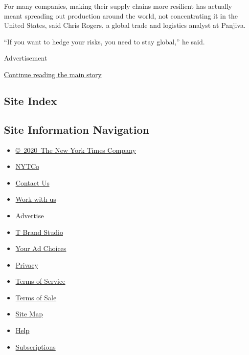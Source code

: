 For many companies, making their supply chains more resilient has
actually meant spreading out production around the world, not
concentrating it in the United States, said Chris Rogers, a global trade
and logistics analyst at Panjiva.

``If you want to hedge your risks, you need to stay global,'' he said.

Advertisement

\protect\hyperlink{after-bottom}{Continue reading the main story}

\hypertarget{site-index}{%
\subsection{Site Index}\label{site-index}}

\hypertarget{site-information-navigation}{%
\subsection{Site Information
Navigation}\label{site-information-navigation}}

\begin{itemize}
\tightlist
\item
  \href{https://help.nytimes.com/hc/en-us/articles/115014792127-Copyright-notice}{©~2020~The
  New York Times Company}
\end{itemize}

\begin{itemize}
\tightlist
\item
  \href{https://www.nytco.com/}{NYTCo}
\item
  \href{https://help.nytimes.com/hc/en-us/articles/115015385887-Contact-Us}{Contact
  Us}
\item
  \href{https://www.nytco.com/careers/}{Work with us}
\item
  \href{https://nytmediakit.com/}{Advertise}
\item
  \href{http://www.tbrandstudio.com/}{T Brand Studio}
\item
  \href{https://www.nytimes.com/privacy/cookie-policy\#how-do-i-manage-trackers}{Your
  Ad Choices}
\item
  \href{https://www.nytimes.com/privacy}{Privacy}
\item
  \href{https://help.nytimes.com/hc/en-us/articles/115014893428-Terms-of-service}{Terms
  of Service}
\item
  \href{https://help.nytimes.com/hc/en-us/articles/115014893968-Terms-of-sale}{Terms
  of Sale}
\item
  \href{https://spiderbites.nytimes.com}{Site Map}
\item
  \href{https://help.nytimes.com/hc/en-us}{Help}
\item
  \href{https://www.nytimes.com/subscription?campaignId=37WXW}{Subscriptions}
\end{itemize}
